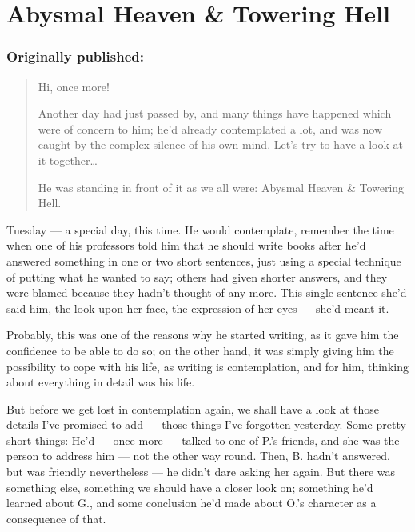 \chapter{Abysmal Heaven \& Towering Hell}
\label{cha:abysmal-heaven-and-towering-hell}
\subsection*{Originally published: }
\begin{quote}
Hi, once more!

Another day had just passed by, and many things have happened which were of concern to him; he'd already contemplated a lot, and was now caught by the complex silence of his own mind. Let's try to have a look at it together\dots{}

He was standing in front of it as we all were: Abysmal Heaven \& Towering Hell.
\end{quote}

Tuesday --- a special day, this time. 
He would contemplate, remember the time when one of his professors told him that he should write books after he'd answered something in one or two short sentences, just using a special technique of putting what he wanted to say; others had given shorter answers, and they were blamed because they hadn't thought of any more. This single sentence she'd said him, the look upon her face, the expression of her eyes --- she'd meant it.

Probably, this was one of the reasons why he started writing, as it gave him the confidence to be able to do so; on the other hand, it was simply giving him the possibility to cope with his life, as writing is contemplation, and for him, thinking about everything in detail was his life.

But before we get lost in contemplation again, we shall have a look at those details I've promised to add --- those things I've forgotten yesterday. Some pretty short things: He'd --- once more --- talked to one of P.'s friends, and she was the person to address him --- not the other way round. Then, B. hadn't answered, but was friendly nevertheless --- he didn't dare asking her again. But there was something else, something we should have a closer look on; something he'd learned about G., and some conclusion he'd made about O.'s character as a consequence of that.


